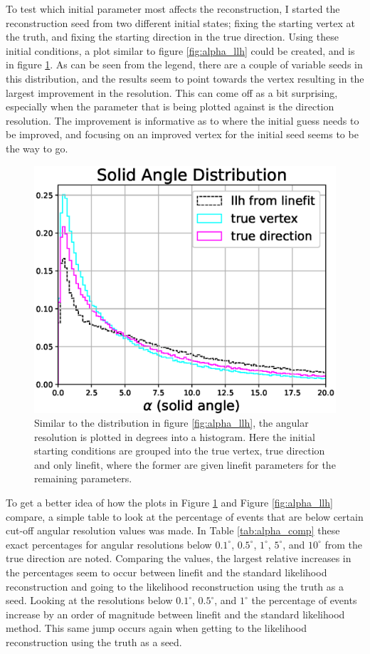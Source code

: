 To test which initial parameter most affects the reconstruction, I started the reconstruction seed from two different initial states; fixing the starting vertex at the truth, and fixing the starting direction in the true direction. Using these initial conditions, a plot similar to figure \ref{fig:alpha_llh} could be created, and is in figure \ref{fig:alpha_llh_test}. As can be seen from the legend, there are a couple of variable seeds in this distribution, and the results seem to point towards the vertex resulting in the largest improvement in the resolution. This can come off as a bit surprising, especially when the parameter that is being plotted against is the direction resolution. The improvement is informative as to where the initial guess needs to be improved, and focusing on an improved vertex for the initial seed seems to be the way to go.

\begin{figure}[H]
  \centering
  \includegraphics[width=12cm]{./Figures/reco_plots/alpha_dist_llh_seedcomparison.eps}
  \caption{Similar to the distribution in figure \ref{fig:alpha_llh}, the angular resolution is plotted in degrees into a histogram. Here the initial starting conditions are grouped into the true vertex, true direction and only linefit, where the former are given linefit parameters for the remaining parameters.}
  \label{fig:alpha_llh_test}
\end{figure}

To get a better idea of how the plots in Figure \ref{fig:alpha_llh_test} and Figure \ref{fig:alpha_llh} compare, a simple table to look at the percentage of events that are below certain cut-off angular resolution values was made. In Table \ref{tab:alpha_comp} these exact percentages for angular resolutions below $0.1^{\circ}$, $0.5^{\circ}$, $1^{\circ}$, $5^{\circ}$, and $10^{\circ}$ from the true direction are noted. Comparing the values, the largest relative increases in the percentages seem to occur between linefit and the standard likelihood reconstruction and going to the likelihood reconstruction using the truth as a seed. Looking at the resolutions below $0.1^{\circ}$, $0.5^{\circ}$, and $1^{\circ}$ the percentage of events increase by an order of magnitude between linefit and the standard likelihood method. This same jump occurs again when getting to the likelihood reconstruction using the truth as a seed. 


